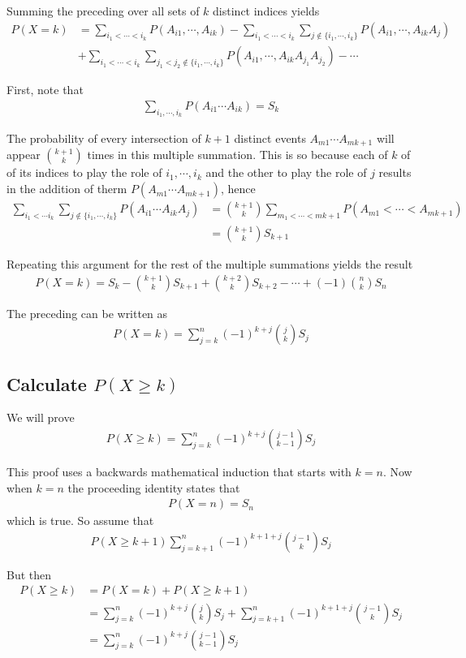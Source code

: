 \documentclass[10 pt,final]{article}
\newcommand{\impo}[1]{{\color{magenta} #1}}
\begin{document}
Summing the preceding over all sets of $k$ distinct indices yields
\begin{align*}
P(X=k) & = \sum_{i_1 < \cdots < i_k} P(A_{i1}, \cdots, A_{ik}) - \sum_{i_1 < \cdots < i_k} \sum_{j \not\in \{i_1, \cdots, i_k\}} P(A_{i1}, \cdots, A_{ik}A_j)\\
& +  \sum_{i_1 < \cdots < i_k} \sum_{j_1 < j_2 \not\in \{i_1, \cdots, i_k\}} P(A_{i1}, \cdots, A_{ik}A_{j_1}A_{j_2})  - \cdots
\end{align*}

First, note that 
\begin{align*}
\sum_{i_1, \cdots, i_k} P(A_{i1} \cdots A_{ik}) = S_k
\end{align*}

The probability of every intersection of $k+1$ distinct events $A_{m1} \cdots A_{m{k+1}}$ will appear $\binom{k+1}{k}$ times in this multiple summation. This is so because each of $k$ of of its indices to play the role of $i_1, \cdots, i_k$ and the other to play the role of $j$ results in the addition of therm $P(A_{m1} \cdots A_{mk+1})$, hence
\begin{align*}
\sum_{i_1 < \cdots i_k} \sum_{j \not\in \{i_1, \cdots, i_k\}} P(A_{i1} \cdots A_{ik} A_j) & = \binom{k+1}{k} \sum_{m_1 < \cdots < mk+1} P(A_{m1} < \cdots < A_{mk+1}) \\
& = \binom{k+1}{k} S_{k+1}
\end{align*}

Repeating this argument for the rest of the multiple summations yields the result
\begin{align*}
P(X=k) = S_k - \binom{k+1}{k} S_{k+1} + \binom{k+2}{k} S_{k+2} - \cdots + (-1)\binom{n}{k}S_n
\end{align*}

The preceding can be written as 
\begin{align*}
P(X=k) = \sum^n_{j=k} (-1)^{k+j} \binom{j}{k} S_j
\end{align*}


\subsection{Calculate $P(X \geq k)$} We will prove
\begin{align*}
P(X \geq k) = \sum^n_{j=k} (-1)^{k+j} \binom{j-1}{k-1} S_j
\end{align*}

This proof uses a \impo{backwards mathematical induction} that starts with $k=n$. Now when $k=n$ the proceeding identity states that 
\begin{align*}
P(X=n) = S_n
\end{align*}
which is true. So assume that 
\begin{align*}
P(X \geq k+1) \sum^n_{j=k+1} (-1)^{k+1+j} \binom{j-1}{k}S_j
\end{align*}

But then 
\begin{align*}
P(X \geq k) & = P(X=k) + P(X \geq k+1) \\
& = \sum^n_{j=k} (-1)^{k+j} \binom{j}{k} S_j + \sum^n_{j=k+1} (-1)^{k+1+j} \binom{j-1}{k} S_j \\
& = \sum^n_{j=k} (-1)^{k+j} \binom{j-1}{k-1} S_j
\end{align*}
\end{document}
